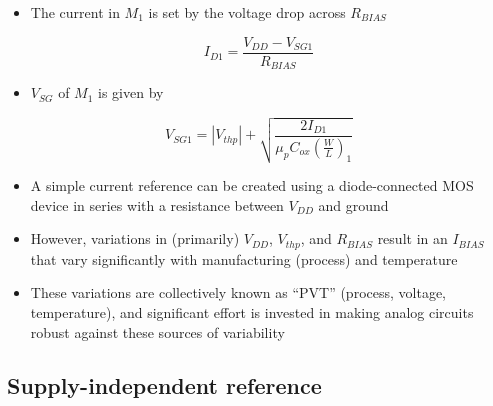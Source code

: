 \documentclass[11pt]{article}
\providecommand{\tightlist}{%
      \setlength{\itemsep}{0pt}\setlength{\parskip}{0pt}}
\begin{document}
    \begin{itemize}
\tightlist
\item
  The current in \(M_1\) is set by the voltage drop across \(R_{BIAS}\)
\end{itemize}

\begin{equation}
I_{D1} = \dfrac{V_{DD}-V_{SG1}}{R_{BIAS}}
\end{equation}

\begin{itemize}
\tightlist
\item
  \(V_{SG}\) of \(M_1\) is given by
\end{itemize}

\begin{equation}
V_{SG1} = |V_{thp}| + \sqrt{\dfrac{2I_{D1}}{\mu_p C_{ox}\left(\frac{W}{L}\right)_1}}
\end{equation}

    \begin{itemize}
\item
  A simple current reference can be created using a diode-connected MOS
  device in series with a resistance between \(V_{DD}\) and ground
\item
  However, variations in (primarily) \(V_{DD}\), \(V_{thp}\), and
  \(R_{BIAS}\) result in an \(I_{BIAS}\) that vary significantly with
  manufacturing (process) and temperature
\item
  These variations are collectively known as ``PVT'' (process, voltage,
  temperature), and significant effort is invested in making analog
  circuits robust against these sources of variability
\end{itemize}

    \hypertarget{supply-independent-reference}{%
\subsection{Supply-independent
reference}\label{supply-independent-reference}}
\end{document}
